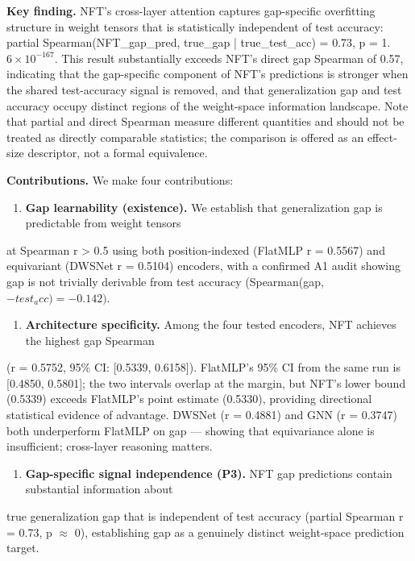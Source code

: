 \textbf{Key finding.} NFT's cross-layer attention captures gap-specific overfitting structure in weight tensors
that is statistically independent of test accuracy: partial Spearman(NFT\_gap\_pred, true\_gap | true\_test\_acc)
= 0.73, p = 1.$6\times 10^{-167}$. This result substantially exceeds NFT's direct gap Spearman of 0.57, indicating
that the gap-specific component of NFT's predictions is stronger when the shared test-accuracy signal is
removed, and that generalization gap and test accuracy occupy distinct regions of the weight-space
information landscape. Note that partial and direct Spearman measure different quantities and should not
be treated as directly comparable statistics; the comparison is offered as an effect-size descriptor, not
a formal equivalence.

\textbf{Contributions.} We make four contributions:

\begin{enumerate}
\item \textbf{Gap learnability (existence).} We establish that generalization gap is predictable from weight tensors
\end{enumerate}
   at Spearman r > 0.5 using both position-indexed (FlatMLP r = 0.5567) and equivariant (DWSNet r = 0.5104)
   encoders, with a confirmed A1 audit showing gap is not trivially derivable from test accuracy
   (Spearman(gap, $-test_acc) = -0.142)$.

\begin{enumerate}
\item \textbf{Architecture specificity.} Among the four tested encoders, NFT achieves the highest gap Spearman
\end{enumerate}
   (r = 0.5752, 95\% CI: [0.5339, 0.6158]). FlatMLP's 95\% CI from the same run is [0.4850, 0.5801];
   the two intervals overlap at the margin, but NFT's lower bound (0.5339) exceeds FlatMLP's point
   estimate (0.5330), providing directional statistical evidence of advantage. DWSNet (r = 0.4881)
   and GNN (r = 0.3747) both underperform FlatMLP on gap --- showing that equivariance alone is
   insufficient; cross-layer reasoning matters.

\begin{enumerate}
\item \textbf{Gap-specific signal independence (P3).} NFT gap predictions contain substantial information about
\end{enumerate}
   true generalization gap that is independent of test accuracy (partial Spearman r = 0.73, p $\approx$ 0),
   establishing gap as a genuinely distinct weight-space prediction target.

